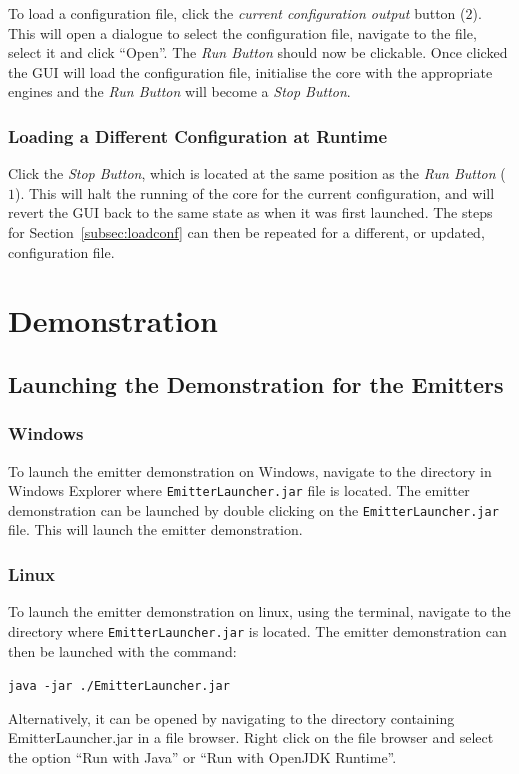 \documentclass[10pt,a4paper]{article}
\begin{document}
To load a configuration file, click the \emph{current configuration output} button ($2$). This will open a dialogue to select the configuration file, navigate to the file, select it and click ``Open''. The \emph{Run Button} should now be clickable. Once clicked the GUI will load the configuration file, initialise the core with the appropriate engines and the \emph{Run Button} will become a \emph{Stop Button}.

\subsubsection{Loading a Different Configuration at Runtime}

Click the \emph{Stop Button}, which is located at the same position as the \emph{Run Button} ($1$). This will halt the running of the core for the current configuration, and will revert the GUI back to the same state as when it was first launched. The steps for Section~\ref{subsec:loadconf} can then be repeated for a different, or updated, configuration file.

\section{Demonstration}
\label{subsec:demo}
\subsection{Launching the Demonstration for the Emitters}
\subsubsection{Windows}
To launch the emitter demonstration on Windows, navigate to the directory in Windows Explorer where \texttt{EmitterLauncher.jar} file is located. The emitter demonstration can be launched by double clicking on the \texttt{EmitterLauncher.jar} file. This will launch the emitter demonstration.
\subsubsection{Linux}
To launch the emitter demonstration on linux, using the terminal, navigate to the directory where \texttt{EmitterLauncher.jar} is located. The emitter demonstration can then be launched with the command:
\begin{center}
\texttt{java -jar ./EmitterLauncher.jar}
\end{center}
Alternatively, it can be opened by navigating to the directory containing EmitterLauncher.jar in a file browser. Right click on the file browser and select the option ``Run with Java'' or ``Run with OpenJDK Runtime''.
\end{document}
